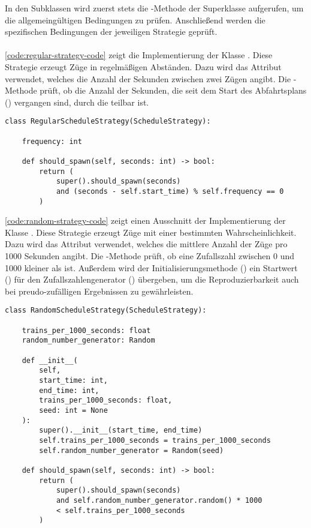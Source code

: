 In den Subklassen wird zuerst stets die -Methode der Superklasse aufgerufen, um die allgemeingültigen Bedingungen zu prüfen. Anschließend werden die spezifischen Bedingungen der jeweiligen Strategie geprüft.\\
\\
\autoref{code:regular-strategy-code} zeigt die Implementierung der Klasse . Diese Strategie erzeugt Züge in regelmäßigen Abständen. Dazu wird das Attribut  verwendet, welches die Anzahl der Sekunden zwischen zwei Zügen angibt. Die -Methode prüft, ob die Anzahl der Sekunden, die seit dem Start des Abfahrtsplans () vergangen sind, durch die  teilbar ist.\\

\lstset{language=python}
\begin{lstlisting}[caption={Ausschnitt aus der Klasse \code{RegularScheduleStrategy} mit der Implementierung der Methode \code{should\_spawn}.}, label=code:regular-strategy-code]
class RegularScheduleStrategy(ScheduleStrategy):

    frequency: int

    def should_spawn(self, seconds: int) -> bool:
        return (
            super().should_spawn(seconds)
            and (seconds - self.start_time) % self.frequency == 0
        )
\end{lstlisting}

\autoref{code:random-strategy-code} zeigt einen Ausschnitt der Implementierung der Klasse . Diese Strategie erzeugt Züge mit einer bestimmten Wahrscheinlichkeit. Dazu wird das Attribut  verwendet, welches die mittlere Anzahl der Züge pro 1000 Sekunden angibt. Die -Methode prüft, ob eine Zufallszahl zwischen 0 und 1000 kleiner als  ist. Außerdem wird der Initialisierungsmethode () ein Startwert () für den Zufallszahlengenerator () übergeben, um die Reproduzierbarkeit auch bei preudo-zufälligen Ergebnissen zu gewährleisten.

\begin{lstlisting}[caption={Ausschnitt aus der Klasse \code{RandomScheduleStrategy} mit der Implementierung der Methode \code{should\_spawn}.}, label=code:random-strategy-code]
class RandomScheduleStrategy(ScheduleStrategy):

    trains_per_1000_seconds: float
    random_number_generator: Random

    def __init__(
        self,
        start_time: int,
        end_time: int,
        trains_per_1000_seconds: float,
        seed: int = None
    ):
        super().__init__(start_time, end_time)
        self.trains_per_1000_seconds = trains_per_1000_seconds
        self.random_number_generator = Random(seed)

    def should_spawn(self, seconds: int) -> bool:
        return (
            super().should_spawn(seconds)
            and self.random_number_generator.random() * 1000
            < self.trains_per_1000_seconds
        )
\end{lstlisting}

